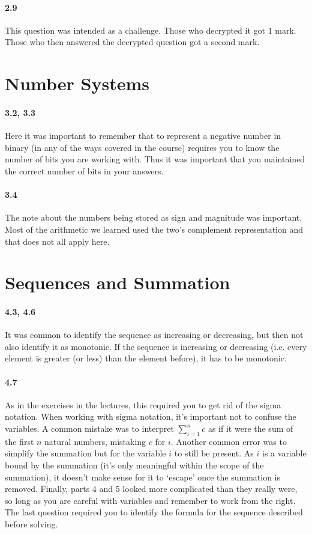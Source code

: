 \documentclass{article}
\begin{document}
\paragraph{2.9} This question was intended as a challenge. Those who decrypted it got 1 mark. Those who then answered the decrypted question got a second mark.

\section{Number Systems}

\paragraph{3.2, 3.3} Here it was important to remember that to represent a negative number in binary (in any of the ways covered in the course) requires you to know the number of bits you are working with. Thus it was important that you maintained the correct number of bits in your answers.

\paragraph{3.4} The note about the numbers being stored as sign and magnitude was important. Most of the arithmetic we learned used the two's complement representation and that does not all apply here.


\section{Sequences and Summation}

\paragraph{4.3, 4.6} It was common to identify the sequence as increasing or decreasing, but then not also identify it as monotonic. If the sequence is increasing or decreasing (i.e. every element is greater (or less) than the element before), it has to be monotonic.

\paragraph{4.7} As in the exercises in the lectures, this required you to get rid of the sigma notation. When working with sigma notation, it's important not to confuse the variables. A common mistake was to interpret $ \sum_{i=1}^{n} c $ as if it were the sum of the first $n$ natural numbers, mistaking $c$ for $i$. Another common error was to simplify the summation but for the variable $i$ to still be present. As $i$ is a variable bound by the summation (it's only meaningful within the scope of the summation), it doesn't make sense for it to `escape' once the summation is removed. Finally, parts 4 and 5 looked more complicated than they really were, so long as you are careful with variables and remember to work from the right. The last question required you to identify the formula for the sequence described before solving.
\end{document}
